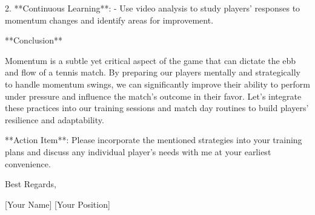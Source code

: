 2. **Continuous Learning**:
   - Use video analysis to study players' responses to momentum changes and identify areas for improvement.

**Conclusion**

Momentum is a subtle yet critical aspect of the game that can dictate the ebb and flow of a tennis match. By preparing our players mentally and strategically to handle momentum swings, we can significantly improve their ability to perform under pressure and influence the match's outcome in their favor. Let's integrate these practices into our training sessions and match day routines to build players' resilience and adaptability.

**Action Item**: Please incorporate the mentioned strategies into your training plans and discuss any individual player's needs with me at your earliest convenience.

Best Regards,

[Your Name]
[Your Position]